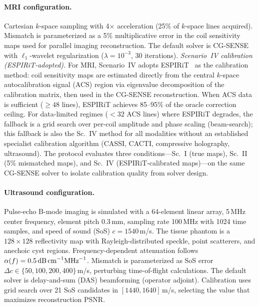 \documentclass[11pt]{article}
\begin{document}
\paragraph{MRI configuration.}
Cartesian $k$-space sampling with 4$\times$ acceleration (25\% of
$k$-space lines acquired).  Mismatch is parameterized as a 5\% multiplicative
error in the coil sensitivity maps used for parallel imaging reconstruction.
The default solver is CG-SENSE~\cite{pruessmann1999sense} with $\ell_1$-wavelet regularization ($\lambda = 10^{-3}$, 30 iterations).
\textit{Scenario~IV calibration (ESPIRiT-adopted).}
For MRI, Scenario~IV adopts ESPIRiT~\cite{uecker2014espirit} as the calibration method: coil sensitivity maps are estimated directly from the central $k$-space autocalibration signal (ACS) region via eigenvalue decomposition of the calibration matrix, then used in the CG-SENSE reconstruction.  When ACS data is sufficient ($\geq 48$ lines), ESPIRiT achieves 85--95\% of the oracle correction ceiling.  For data-limited regimes ($< 32$ ACS lines) where ESPIRiT degrades, the fallback is a grid search over per-coil amplitude and phase scaling (beam-search); this fallback is also the Sc.~IV method for all modalities without an established specialist calibration algorithm (CASSI, CACTI, compressive holography, ultrasound).  The protocol evaluates three conditions---Sc.~I (true maps), Sc.~II (5\% mismatched maps), and Sc.~IV (ESPIRiT-calibrated maps)---on the same CG-SENSE solver to isolate calibration quality from solver design.

\paragraph{Ultrasound configuration.}
Pulse-echo B-mode imaging is simulated with a 64-element linear array,
5\,MHz center frequency, element pitch $0.3$\,mm, sampling rate 100\,MHz
with 1024 time samples, and speed of sound (SoS) $c = 1540$\,m/s.  The
tissue phantom is a $128 \times 128$ reflectivity map with
Rayleigh-distributed speckle, point scatterers, and anechoic cyst regions.
Frequency-dependent attenuation follows
$\alpha(f) = 0.5\,\text{dB\,cm}^{-1}\text{MHz}^{-1}$.  Mismatch is
parameterized as SoS error $\Delta c \in \{50, 100, 200, 400\}$\,m/s,
perturbing time-of-flight calculations.  The default solver is delay-and-sum
(DAS) beamforming (operator adjoint).  Calibration uses grid search over
21 SoS candidates in $[1440, 1640]$\,m/s, selecting the value that
maximizes reconstruction PSNR.
\end{document}
